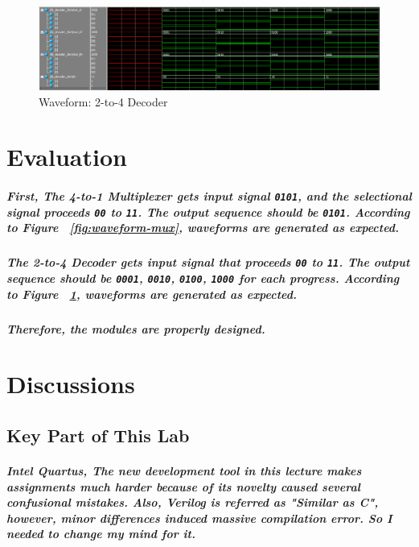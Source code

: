 \documentclass{report}
\begin{document}
            \begin{figure}[!htb]
                \centering
                \includegraphics[width=\textwidth]{diagrams/waveform_decoder.PNG}
                \caption{Waveform: 2-to-4 Decoder}
                \label{fig:waveform-decoder}
            \end{figure} 
    \chapter{Evaluation}
        \paragraph{\normalfont First, The 4-to-1 Multiplexer gets input signal \texttt{0101}, and the selectional signal proceeds \texttt{00} to \texttt{11}. The output sequence should be \texttt{0101}. According to Figure ~\ref{fig:waveform-mux}, waveforms are generated as expected.}

        \paragraph{\normalfont The 2-to-4 Decoder gets input signal that proceeds \texttt{00} to \texttt{11}. The output sequence should be \texttt{0001}, \texttt{0010}, \texttt{0100}, \texttt{1000} for each progress. According to Figure ~\ref{fig:waveform-decoder}, waveforms are generated as expected. }

        \paragraph{\normalfont Therefore, the modules are properly designed.}
    \chapter{Discussions}
        \section{Key Part of This Lab}
        
        \paragraph{\normalfont Intel Quartus, The new development tool in this lecture makes assignments much harder because of its novelty caused several confusional mistakes. Also, Verilog is referred as "Similar as C", however, minor differences induced massive compilation error. So I needed to change my mind for it.}
\end{document}
